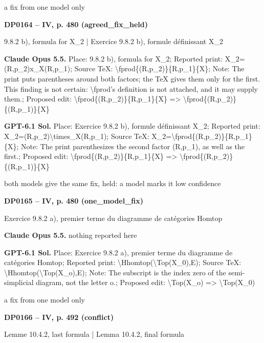 a fix from one model only\par
\par\noindent\hypertarget{DP0164}{}\textbf{DP0164 -- IV, p. 480 (agreed\_fix\_held)}\par
9.8.2 b), formula for X\_2 | Exercice 9.8.2 b), formule définissant X\_2\par
\textbf{Claude Opus 5.5.} Place: 9.8.2 b), formula for X\_2; Reported print: X\_2=\allowbreak (R,p\_2)x\_X(R,p\_1); Source TeX: \textbackslash{}fprod\{(R,p\_2)\}\{R,p\_1\}\{X\}; Note: The print puts parentheses around both factors; the TeX gives them only for the first. This finding is not certain: \textbackslash{}fprod's definition is not attached, and it may supply them.; Proposed edit: \textbackslash{}fprod\{(R,p\_2)\}\{R,p\_1\}\{X\} =\allowbreak > \textbackslash{}fprod\{(R,p\_2)\}\{(R,p\_1)\}\{X\}\par
\textbf{GPT-6.1 Sol.} Place: Exercice 9.8.2 b), formule définissant X\_2; Reported print: X\_2=\allowbreak (R,p\_2)\textbackslash{}times\_X(R,p\_1); Source TeX: X\_2=\allowbreak \textbackslash{}fprod\{(R,p\_2)\}\{R,p\_1\}\{X\}; Note: The print parenthesizes the second factor (R,p\_1), as well as the first.; Proposed edit: \textbackslash{}fprod\{(R,p\_2)\}\{R,p\_1\}\{X\} =\allowbreak > \textbackslash{}fprod\{(R,p\_2)\}\{(R,p\_1)\}\{X\}\par
both models give the same fix, held: a model marks it low confidence\par
\par\noindent\hypertarget{DP0165}{}\textbf{DP0165 -- IV, p. 480 (one\_model\_fix)}\par
Exercice 9.8.2 a), premier terme du diagramme de catégories Homtop\par
\textbf{Claude Opus 5.5.} nothing reported here\par
\textbf{GPT-6.1 Sol.} Place: Exercice 9.8.2 a), premier terme du diagramme de catégories Homtop; Reported print: \textbackslash{}Hhomtop(\textbackslash{}Top(X\_0),E); Source TeX: \textbackslash{}Hhomtop(\textbackslash{}Top(X\_o),E); Note: The subscript is the index zero of the semi-simplicial diagram, not the letter o.; Proposed edit: \textbackslash{}Top(X\_o) =\allowbreak > \textbackslash{}Top(X\_0)\par
a fix from one model only\par
\par\noindent\hypertarget{DP0166}{}\textbf{DP0166 -- IV, p. 492 (conflict)}\par
Lemme 10.4.2, last formula | Lemma 10.4.2, final formula\par
